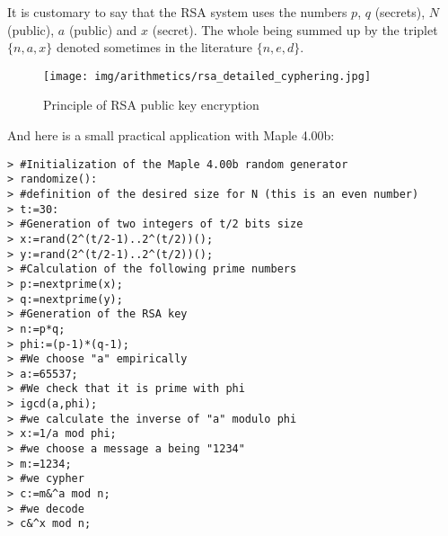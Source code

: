 	It is customary to say that the RSA system uses the numbers $p$, $q$ (secrets), $N$ (public), $a$ (public) and $x$ (secret). The whole being summed up by the triplet $\{n, a, x\}$ denoted sometimes in the literature $\{n, e, d\}$.
	\begin{figure}[H]
		\centering
		\texttt{[image: img/arithmetics/rsa\_detailed\_cyphering.jpg]}
		\caption{Principle of RSA public key encryption}
	\end{figure}
	And here is a small practical application with Maple 4.00b:
	
	\texttt{> \#Initialization of the Maple 4.00b random generator\\
	> randomize():\\
	> \#definition of the desired size for N (this is an even number)\\
	> t:=30:\\
	> \#Generation of two integers of t/2 bits size\\
	> x:=rand(2\string^(t/2-1)..2\string^(t/2))();\\
	> y:=rand(2\string^(t/2-1)..2\string^(t/2))();\\
	> \#Calculation of the following prime numbers\\
	> p:=nextprime(x);\\
	> q:=nextprime(y);\\
	> \#Generation of the RSA key\\
	> n:=p*q;\\
	> phi:=(p-1)*(q-1);\\
	> \#We choose "a" empirically\\
	> a:=65537;\\
	> \#We check that it is prime with phi\\
	> igcd(a,phi);\\
	> \#we calculate the inverse of "a" modulo phi\\
	> x:=1/a mod phi;\\
	> \#we choose a message a being "1234"\\
	> m:=1234;\\
	> \#we cypher\\
	> c:=m\&\string^a mod n;\\
	> \#we decode\\
	> c\&\string^x mod n;\\
	}

